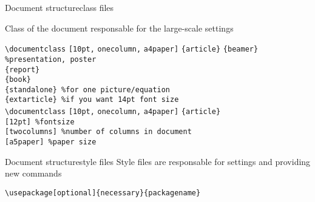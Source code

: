 \begin{frame}[fragile]{Document structure}{class files}

Class of the document responsable for the large-scale settings
    \cprotect{} 
{
\scriptsize
\begin{tabbing}
\lstinline|\documentclass|\hspace{-1ex} \= \lstinline|[10pt,|  \= \lstinline|onecolumn,|  \=  \lstinline|a4paper]|\hspace{-1ex} \= \lstinline|{article}| \kill
\> \> \> \> \lstinline|{beamer} %presentation, poster| \\
\> \> \> \> \lstinline|{report}| \\
\> \> \> \> \lstinline|{book}| \\
\> \> \> \> \lstinline|{standalone} %for one picture/equation| \\
\> \> \> \> \lstinline|{extarticle} %if you want 14pt font size| \\
\lstinline|\documentclass| \> \lstinline|[10pt,|  \> \lstinline|onecolumn,|  \>  \lstinline|a4paper]| \> \lstinline|{article}| \\ 
\> \lstinline|[12pt] %fontsize| \> \\ 
\> \> \lstinline|[twocolumns] %number of columns in document| \> \\ 
\> \> \> \lstinline|[a5paper] %paper size| \> \\ 
\end{tabbing}}
\cprotect{}
\end{frame}

\begin{frame}[fragile]{Document structure}{style files}
     Style files are responsable for settings and providing new commands 
     
     \vfill
     \hspace{-1ex}
     \lstinline[basicstyle=\tt\large]|\usepackage[optional]{necessary}{packagename}|
     \vfill
\end{frame}

